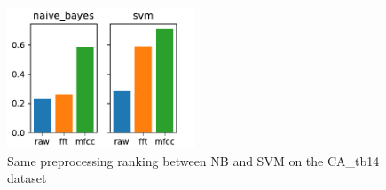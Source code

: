 \documentclass[../main.tex]{subfiles}
\begin{document}
\begin{figure}
    \centering
    \includegraphics[width=0.5\textwidth]{figures/plots/model_comparison/custom_naive_bayes_svm_CA_tb14.pdf}
    \caption{Same preprocessing ranking between NB and SVM on the CA\_tb14 dataset}
    \label{fig:selective_model_comparison_naive_bayes_svm_CA_tb14}
\end{figure}
\end{document}
